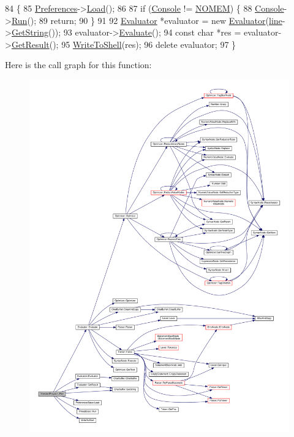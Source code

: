 \begin{DoxyCode}
84 \{
85     \hyperlink{classProgram_ad6baa89972cb4938db341c77c1510793}{Preferences}->\hyperlink{classPreferencesBase_ab4e17e21f4377c44fa0ba16a0868a206}{Load}();
86 
87     \textcolor{keywordflow}{if} (\hyperlink{classProgram_a7edba60e839230f20ce29716567bc892}{Console} != \hyperlink{platform_8h_a46ff2bfbf0d44b8466a2251d5bd5e6f8}{NOMEM}) \{
88         \hyperlink{classProgram_a7edba60e839230f20ce29716567bc892}{Console}->\hyperlink{classThreadBase_a795d258c1f40c123859d0e83dce6a0ad}{Run}();
89         \textcolor{keywordflow}{return};
90     \}
91 
92     \hyperlink{classEvaluator}{Evaluator} *evaluator = \textcolor{keyword}{new} \hyperlink{classEvaluator}{Evaluator}(\hyperlink{classStandardProgram_aba785a89c947a8a2c42aec60e98bd9cd}{line}->\hyperlink{classCharBuffer_a7dfd3feaaf80f318ba44efe15b1ec44b}{GetString}());
93     evaluator->\hyperlink{classEvaluator_a40b30ece9d43c658877ee7f52aaec0a8}{Evaluate}();
94     \textcolor{keyword}{const} \textcolor{keywordtype}{char} *res = evaluator->\hyperlink{classEvaluator_abcc678772175bf00127a3b307463ae4b}{GetResult}();
95     \hyperlink{io_8h_afabbf967db247cad6ad9a6f416e99e12}{WriteToShell}(res);
96     \textcolor{keyword}{delete} evaluator;
97 \}
\end{DoxyCode}


Here is the call graph for this function\+:\nopagebreak
\begin{figure}[H]
\begin{center}
\leavevmode
\includegraphics[width=350pt]{classStandardProgram_a71dce9fdccf23ac49ba2362dcae744d3_cgraph}
\end{center}
\end{figure}




